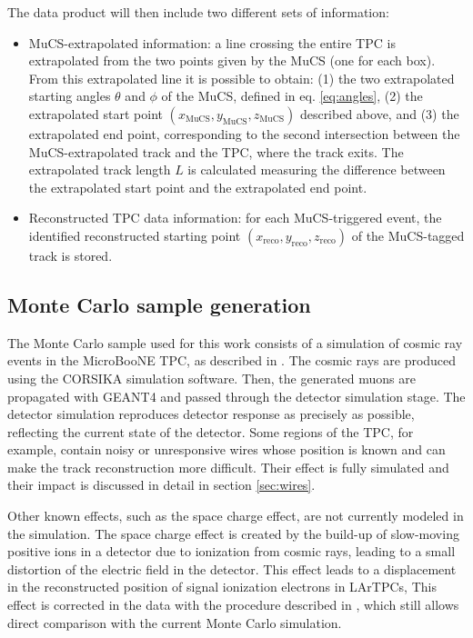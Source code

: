 \documentclass[a4paper,11pt]{article}
\begin{document}
The data product will then include two different sets of information:
\begin{itemize}
  \item MuCS-extrapolated information: a line crossing the entire TPC is extrapolated from the two points given by the MuCS (one for each box). From this extrapolated line it is possible to obtain: (1) the two extrapolated starting angles $\theta$ and $\phi$ of the MuCS, defined in eq. \eqref{eq:angles}, (2) the extrapolated start point $(x_{\mathrm{MuCS}},y_{\mathrm{MuCS}},z_{\mathrm{MuCS}})$ described above, and (3) the extrapolated end point, corresponding to the second intersection between the MuCS-extrapolated track and the TPC, where the track exits. The extrapolated track length $L$ is calculated measuring the difference between the extrapolated start point and the extrapolated end point.
  \item Reconstructed TPC data information: for each MuCS-triggered event, the identified reconstructed starting point $(x_{\mathrm{reco}},y_{\mathrm{reco}},z_{\mathrm{reco}})$ of the MuCS-tagged track is stored.
\end{itemize}

\subsection{Monte Carlo sample generation}\label{sec:mcgen}

The Monte Carlo sample used for this work consists of a simulation of cosmic ray events in the MicroBooNE TPC, as described in \cite{cosmic}. The cosmic rays are produced using the CORSIKA \cite{corsika} simulation software. Then, the generated muons are propagated with GEANT4 \cite{geant} and passed through the detector simulation stage. The detector simulation reproduces detector response as precisely as possible, reflecting the current state of the detector. Some regions of the TPC, for example, contain noisy or unresponsive wires whose position is known and can make the track reconstruction more difficult. Their effect is fully simulated and their impact is discussed in detail in section \ref{sec:wires}.

Other known effects, such as the space charge effect, are not currently modeled in the simulation. The space charge effect is created by the build-up of slow-moving positive ions in a detector due to ionization from cosmic rays, leading to a small distortion of the electric field in the detector. This effect leads to a displacement in the reconstructed position of signal ionization electrons in LArTPCs, This effect is corrected in the data with the procedure described in \cite{sce}, which still allows direct comparison with the current Monte Carlo simulation.
\end{document}
